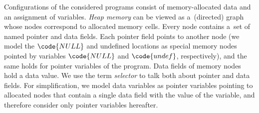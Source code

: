 {%
%

Configurations of the considered programs consist of
memory-allocated data and an assignment of variables.
\emph{Heap memory} can be viewed as a~(directed) graph whose nodes correspond
to allocated memory cells.
Every node contains a~set of named pointer and data fields.
Each pointer field points to another node (we model the
$\code{NULL}$ and undefined locations as special memory nodes pointed by variables
$\code{NULL}$ and $\code{undef}$, respectively), and the same holds for pointer variables of the program.
Data fields of memory nodes hold a data value.
We use the term \emph{selector} to talk both about pointer and data fields.
For simplification, we model data variables as pointer variables pointing to
allocated nodes that contain a single data field with the value of the
variable, and therefore consider only pointer
variables hereafter.


}
